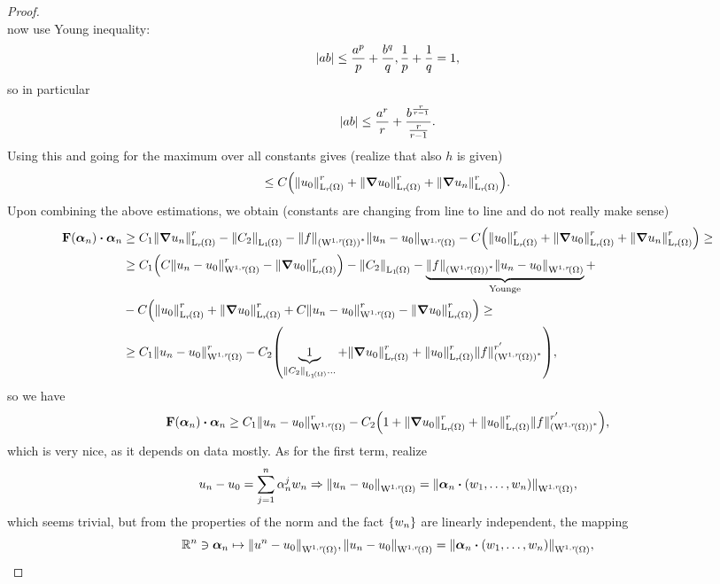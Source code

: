 \documentclass{article}
\begin{document}
\begin{proof}
\[\]
now use Young inequality:
\[
	\abs{ab} \leq \frac{a^p}{p} + \frac{b^q}{q}, \frac{1}{p} + \frac{1}{q} = 1,
\]
so in particular
\[
	\abs{ab} \leq \frac{a^r}{r} + \frac{b^{\frac{r}{r-1}}}{\frac{r}{r-1}}.
\]
Using this and going for the maximum over all constants gives (realize that also $h$ is given)
\[
	\leq C\qty(\norm{u_0}_{\LpSet[r]{\Omega}}^r + \norm{\grad u_0}_{\LpSet[r]{\Omega}}^r + \norm{\grad u_n}_{\LpSet[r]{\Omega}}^{r}).
\]
Upon combining the above estimations, we obtain (constants are changing from line to line and do not really make sense)
\begin{align*}
	\vb{F}\qty(\vb*{\alpha}_n) \vdot \vb*{\alpha}_n &\geq C_1 \norm{\grad u_n}_{\LpSet[r]{\Omega}}^r - \norm{C_2}_{\LpSet[1]{\Omega}} - \norm{f}_{\qty(\WkpSet[1][r]{\Omega})^{*}}\norm{u_n - u_0}_{\WkpSet[1][r]{\Omega}} - C \qty(\norm{u_0}_{\LpSet[r]{\Omega}}^r + \norm{\grad u_0}_{\LpSet[r]{\Omega}}^r + \norm{\grad u_n}_{\LpSet[r]{\Omega}}^r) \geq \\
							&\geq C_1\qty(C \norm{u_n - u_0}_{\WkpSet[1][r]{\Omega}}^r - \norm{\grad u_0}_{\LpSet[r]{\Omega}}^r) - \norm{C_2}_{\LpSet[1]{\Omega}} -\underbrace{\norm{f}_{\qty(\WkpSet[1][r]{\Omega})^{*}}\norm{u_n - u_0}_{\WkpSet[1][r]{\Omega}}}_{\, \text{Younge} \,}+ \\
							&	-C \qty(\norm{u_0}_{\LpSet[r]{\Omega}}^r + \norm{\grad u_0}_{\LpSet[r]{\Omega}}^r + C \norm{u_n - u_0}_{\WkpSet[1][r]{\Omega}}^r - \norm{\grad u_0}_{\LpSet[r]{\Omega}}^r) \geq \\
							&\geq C_1 \norm{u_n - u_0}_{\WkpSet[1][r]{\Omega}}^r - C_2\qty(\underbrace{1}_{\norm{C_2}_{\LpSet[1]{\Omega}}...} + \norm{\grad u_0}_{\LpSet[r]{\Omega}}^r + \norm{u_0}_{\LpSet[r]{\Omega}}^r \norm{f}_{\qty(\WkpSet[1][r]{\Omega})^{*}}^{r'}),
\end{align*}
so we have
\[
	\vb{F}\qty(\vb*{\alpha}_n) \vdot \vb*{\alpha}_n  \geq C_1 \norm{u_n - u_0}_{\WkpSet[1][r]{\Omega}}^r - C_2\qty(1 + \norm{\grad u_0}_{\LpSet[r]{\Omega}}^r + \norm{u_0}_{\LpSet[r]{\Omega}}^r \norm{f}_{\qty(\WkpSet[1][r]{\Omega})^{*}}^{r'}),
\]
which is very nice, as it depends on data mostly. As for the first term, realize
	\[
		u_n - u_0 = \sum_{j=1}^n \alpha_n^j w_n \Rightarrow \norm{u_n - u_0}_{\WkpSet[1][r]{\Omega}} = \norm{\vb*{\alpha}_n \vdot \qty(w_1, \dots, w_n)}_{\WkpSet[1][r]{\Omega}},
	\]
	which seems trivial, but from the properties of the norm and the fact $\qty{w_n}$ are linearly independent, the mapping
	\[
		\R^{n} \ni \vb*{\alpha}_n  \mapsto \norm{u^n-u_0}_{\WkpSet[1][r]{\Omega}}, \norm{u_n - u_0}_{\WkpSet[1][r]{\Omega}} = \norm{\vb*{\alpha}_n \vdot \qty(w_1, \dots, w_n)}_{\WkpSet[1][r]{\Omega}},
\]
\end{proof}
\end{document}
